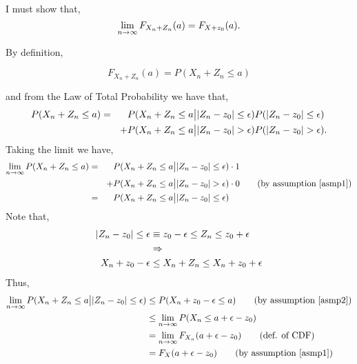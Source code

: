 \\
I must show that,
\begin{equation*}
    \underset{n\rightarrow \infty}{\lim}\, F_{X_n + Z_n}(a) = F_{X + z_0}(a).
\end{equation*}

By definition,

\begin{equation*}
F_{X_n + Z_n}(a) = P(X_n + Z_n \leq a)
\end{equation*}

and from the Law of Total Probability we have that, 
\begin{align*}
    P(X_n + Z_n \leq a) &= \quad\;\, P(X_n + Z_n \leq a \big\lvert  \lvert Z_n - z_0\rvert \leq \epsilon)P(\lvert Z_n - z_0\rvert \leq \epsilon) \\
                     &{\quad\quad+} P(X_n + Z_n \leq a \big\lvert  \lvert Z_n - z_0\rvert > \epsilon)P(\lvert Z_n - z_0\rvert > \epsilon).\\
\end{align*}
Taking the limit we have,
\begin{align*}
 \limit{n}{\infty} P(X_n + Z_n \leq a) &= \quad\;\, P(X_n + Z_n \leq a \big\lvert  \abs{Z_n - z_0} \leq \epsilon)\cdot 1 \\
                                                       &{\quad\quad+} P(X_n + Z_n \leq a \big\lvert  \abs{Z_n - z_0} > \epsilon)\cdot 0 \tag*{(by assumption \ref{asmp1})}\\
                                                       &= \quad\;\, P(X_n + Z_n \leq a \big\lvert  \abs{Z_n - z_0} \leq \epsilon)
\end{align*}
Note that,    
\begin{align*}
    \lvert Z_n - z_0\rvert \leq \epsilon &\equiv z_0 - \epsilon \leq Z_n \leq z_0 + \epsilon \\
                               &\Rightarrow \\
    X_n + z_0 - \epsilon &\leq X_n +Z_n \leq X_n + z_0 + \epsilon\\
\end{align*}
Thus,
\begin{align*}
    \limit{n}{\infty} P(X_n + Z_n \leq a \big\lvert \abs{Z_n - z_0} \leq \epsilon) 
                                                          &\leq P(X_n + z_0 - \epsilon \leq a   )\tag*{(by assumption \ref{asmp2})}\\ 
                                                          &\leq \limit{n}{\infty}  P(X_n \leq a + \epsilon - z_0  )\\
                                                          &= \limit{n}{\infty} F_{X_n}(a + \epsilon- z_0)        \tag*{(def. of CDF)}\\
                                                          &= F_{X}(a + \epsilon- z_0)   \tag*{(by assumption \ref{asmp1})} 
\end{align*}
